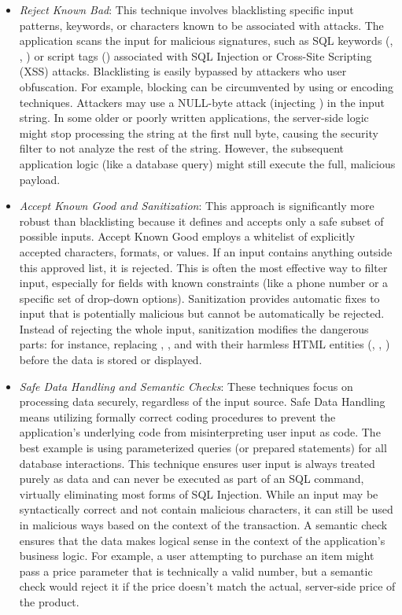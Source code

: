 \begin{itemize}
    \item \textit{Reject Known Bad}: This technique involves blacklisting specific input patterns, keywords, or characters known to be associated with attacks. The application scans the input for malicious signatures, such as SQL keywords (, , ) or script tags () associated with SQL Injection or Cross-Site Scripting (XSS) attacks. Blacklisting is easily bypassed by attackers who user obfuscation. For example, blocking  can be circumvented by using  or encoding techniques. Attackers may use a NULL-byte attack (injecting ) in the input string. In some older or poorly written applications, the server-side logic might stop processing the string at the first null byte, causing the security filter to not analyze the rest of the string. However, the subsequent application logic (like a database query) might still execute the full, malicious payload.
    \item \textit{Accept Known Good and Sanitization}: This approach is significantly more robust than blacklisting because it defines and accepts only a safe subset of possible inputs. Accept Known Good employs a whitelist of explicitly accepted characters, formats, or values. If an input contains anything outside this approved list, it is rejected. This is often the most effective way to filter input, especially for fields with known constraints (like a phone number or a specific set of drop-down options). Sanitization provides automatic fixes to input that is potentially malicious but cannot be automatically be rejected. Instead of rejecting the whole input, sanitization modifies the dangerous parts: for instance, replacing \NewTexttt{<}, \NewTexttt{>}, and \NewTexttt{\&} with their harmless HTML entities (, , ) before the data is stored or displayed.
    \item \textit{Safe Data Handling and Semantic Checks}: These techniques focus on processing data securely, regardless of the input source. Safe Data Handling means utilizing formally correct coding procedures to prevent the application's underlying code from misinterpreting user input as code. The best example is using parameterized queries (or prepared statements) for all database interactions. This technique ensures user input is always treated purely as data and can never be executed as part of an SQL command, virtually eliminating most forms of SQL Injection. While an input may be syntactically correct and not contain malicious characters, it can still be used in malicious ways based on the context of the transaction. A semantic check ensures that the data makes logical sense in the context of the application's business logic. For example, a user attempting to purchase an item might pass a price parameter that is technically a valid number, but a semantic check would reject it if the price doesn't match the actual, server-side price of the product.


\end{itemize}
